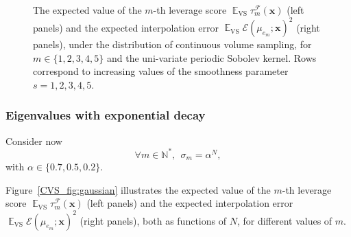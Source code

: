 \documentclass[twoside,11pt]{book}
\numberwithin{theorem}{chapter}
\numberwithin{definition}{chapter}
\numberwithin{proposition}{chapter}
\numberwithin{corollary}{chapter}
\numberwithin{example}{chapter}
\numberwithin{lemma}{chapter}
\numberwithin{assumption}{chapter}
\numberwithin{equation}{chapter}
\numberwithin{figure}{chapter}
\DeclareMathOperator{\VS}{\mathrm{VS}}
\DeclareMathOperator{\EX}{\mathbb{E}}
\DeclareMathOperator{\F}{\mathcal{F}}
\begin{document}
\begin{figure}[!]
\caption{The expected value of the $m$-th leverage score $\EX_{\VS} \tau_{m}^{\F}(\bm{x})$ (left panels) and the expected interpolation error $\EX_{\VS} \mathcal{E}(\mu_{e_{m}};\bm{x})^{2}$ (right panels), under the distribution of continuous volume sampling, for $m \in \{1,2,3,4,5\}$ and the uni-variate periodic Sobolev kernel.
Rows correspond to increasing values of the smoothness parameter $s=1,2,3,4,5$.\label{CVS_fig:periodic_sobolev}}
\end{figure}


\subsubsection{Eigenvalues with exponential decay}
Consider now
\begin{equation}
\forall m \in \mathbb{N}^{*}, \:\: \sigma_{m}=\alpha^{N},
\end{equation}
with $ \alpha \in \{0.7,0.5,0.2 \}$.

Figure~\ref{CVS_fig:gaussian} illustrates the expected value of the $m$-th leverage score $\EX_{\VS} \tau_{m}^{\F}(\bm{x})$ (left panels) and the expected interpolation error $\EX_{\VS} \mathcal{E}(\mu_{e_{m}};\bm{x})^{2}$ (right panels), both as functions of $N$, for different values of $m$. 
\end{document}
